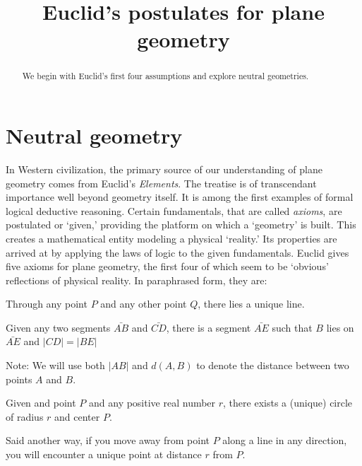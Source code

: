 \documentclass[handout]{ximera}
\title{Euclid's postulates for plane geometry} %
\begin{document}
\begin{abstract}
We begin with Euclid's first four assumptions and explore neutral
geometries.
\end{abstract}
\maketitle



\section*{Neutral geometry}




In Western civilization, the primary source of our understanding of
plane geometry comes from Euclid's \textit{Elements}. The treatise is
of transcendant importance well beyond geometry itself. It is among
the first examples of formal logical deductive reasoning. Certain
fundamentals, that are called \textit{axioms}, are postulated or
`given,' providing the platform on which a `geometry' is built. This
creates a mathematical entity modeling a physical `reality.' Its
properties are arrived at by applying the laws of logic to the given
fundamentals. Euclid gives five axioms for plane geometry, the first
four of which seem to be `obvious' reflections of physical reality. In
paraphrased form, they are:

\begin{axiom}[E1]
Through any point $P$ and any other point $Q$, there lies a unique
line.
\end{axiom}

\begin{axiom}[E2] 
Given any two segments $\bar{AB}$ and $\bar{CD}$, there is a
segment $\bar{AE}$ such that $B$ lies on $\bar{AE}$ and
$\left\vert CD\right\vert =\left\vert BE\right\vert $

Note: We will use both $\left\vert AB\right\vert$ and $d(A,B)$ to
denote the distance between two points $A$ and $B$.
\end{axiom}

\begin{axiom}[E3]
Given and point $P$ and any positive real number $r$, there exists a
(unique) circle of radius $r$ and center $P$. 

Said another way, if you move away from point $P$ along a line in any
direction, you will encounter a unique point at distance $r$ from $P$.
\end{axiom}
\end{document}
